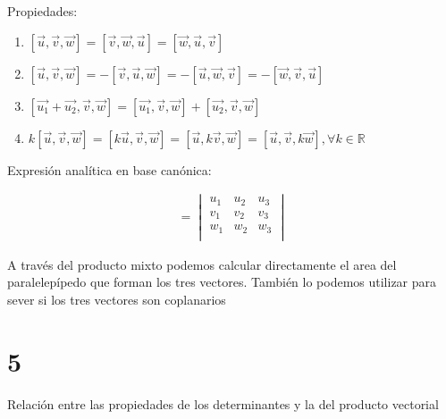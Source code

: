 \documentclass[
	12pt, %
	spanish, %
]{fphw}
\newcommand{\vu}{\vec{u}}
\newcommand{\vv}{\vec{v}}
\newcommand{\vw}{\vec{w}}
\begin{document}
Propiedades:

\begin{enumerate}
	\item $[\vu,\vv,\vw] = [\vv,\vw,\vu] = [\vw,\vu,\vv]$
	\item $[\vu,\vv,\vw] = - [\vv,\vu,\vw] = - [\vu,\vw,\vv] = - [\vw,\vv,\vu]$
	\item $[\vec{u_1} + \vec{u_2}, \vv,\vw] = [\vec{u_1},\vv,\vw] + [\vec{u_2},\vv,\vw]$
	\item $k[\vu,\vv,\vw] = [k\vu,\vv,\vw] = [\vu,k\vv,\vw] = [\vu,\vv,k\vw], \forall k \in \mathbb{R}$
\end{enumerate}

Expresión analítica en base canónica:

\begin{gather*}
	[\vu,\vv,\vw] = 
	\begin{vmatrix}
		u_1 & u_2 & u_3\\
		v_1 & v_2 & v_3\\
		w_1 & w_2 & w_3 \\
	\end{vmatrix}
\end{gather*}

A través del producto mixto podemos calcular directamente el area del paralelepípedo que forman los tres vectores. También lo podemos utilizar para sever si los tres vectores son coplanarios

\section*{5}

\begin{problem}
	Relación entre las propiedades de los determinantes y la del producto vectorial
\end{problem}
\end{document}
